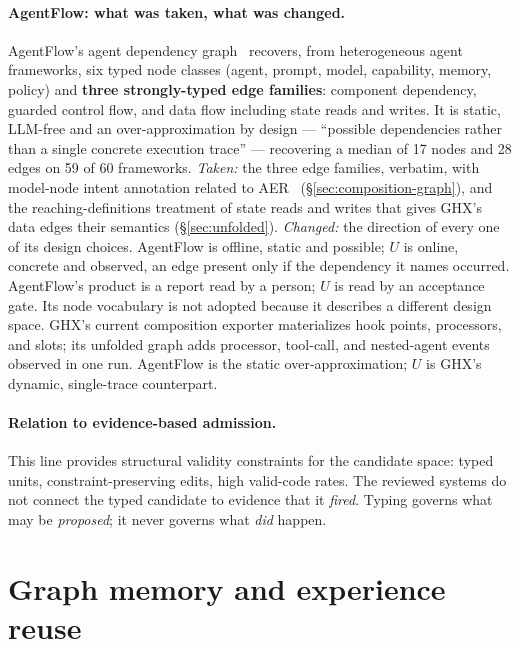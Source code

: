 \paragraph{AgentFlow: what was taken, what was changed.}
AgentFlow's agent dependency graph~\cite{agentflow} recovers, from
heterogeneous agent frameworks, six typed node classes (agent, prompt,
model, capability, memory, policy) and \textbf{three strongly-typed edge
families}: component dependency, guarded control flow, and data flow
including state reads and writes. It is static, LLM-free and an
over-approximation by design --- ``possible dependencies rather than a
single concrete execution trace'' --- recovering a median of 17 nodes and
28 edges on 59 of 60 frameworks. \emph{Taken:} the three edge families,
verbatim, with model-node intent annotation related to AER~\cite{aer} (\S\ref{sec:composition-graph}), and the reaching-definitions
treatment of state reads and writes that gives GHX's data edges their
semantics (\S\ref{sec:unfolded}). \emph{Changed:} the direction of every
one of its design choices. AgentFlow is offline, static and possible;
$U$ is online, concrete and observed, an edge present only if the
dependency it names occurred. AgentFlow's product is a report read by a
person; $U$ is read by an acceptance gate. Its node vocabulary is not
adopted because it describes a different design space. GHX's current
composition exporter materializes hook points, processors, and slots; its
unfolded graph adds processor, tool-call, and nested-agent events observed
in one run. AgentFlow is the static over-approximation; $U$ is GHX's
dynamic, single-trace counterpart.

\paragraph{Relation to evidence-based admission.} This line provides
structural validity constraints for the candidate space: typed units, constraint-preserving
edits, high valid-code rates. The reviewed systems do not connect the typed
candidate to evidence that it \emph{fired}. Typing governs what may be
\emph{proposed}; it never governs what \emph{did} happen.

\section{Graph memory and experience reuse}
\label{sec:graph-memory}

